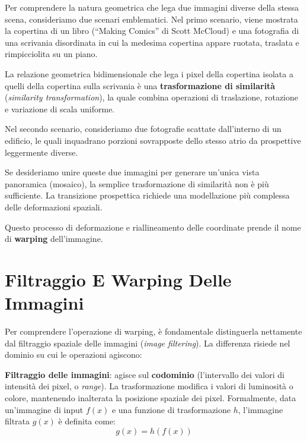 ﻿\documentclass[11pt, a4paper]{article}
\begin{document}
Per comprendere la natura geometrica che lega due immagini diverse della stessa scena, consideriamo due scenari emblematici. Nel primo scenario, viene mostrata la copertina di un libro (``Making Comics'' di Scott McCloud) e una fotografia di una scrivania disordinata in cui la medesima copertina appare ruotata, traslata e rimpicciolita su un piano.


La relazione geometrica bidimensionale che lega i pixel della copertina isolata a quelli della copertina sulla scrivania è una \textbf{trasformazione di similarità} (\emph{similarity transformation}), la quale combina operazioni di traslazione, rotazione e variazione di scala uniforme.

Nel secondo scenario, consideriamo due fotografie scattate dall'interno di un edificio, le quali inquadrano porzioni sovrapposte dello stesso atrio da prospettive leggermente diverse.


Se desideriamo unire queste due immagini per generare un'unica vista panoramica (mosaico), la semplice trasformazione di similarità non è più sufficiente. La transizione prospettica richiede una modellazione più complessa delle deformazioni spaziali.


Questo processo di deformazione e riallineamento delle coordinate prende il nome di \textbf{warping} dell'immagine.

\newpage

\section{Filtraggio E Warping Delle Immagini}

Per comprendere l'operazione di warping, è fondamentale distinguerla nettamente dal filtraggio spaziale delle immagini (\emph{image filtering}). La differenza risiede nel dominio su cui le operazioni agiscono:

\textbf{Filtraggio delle immagini}: agisce sul \textbf{codominio} (l'intervallo dei valori di intensità dei pixel, o \emph{range}). La trasformazione modifica i valori di luminosità o colore, mantenendo inalterata la posizione spaziale dei pixel. Formalmente, data un'immagine di input $f(x)$ e una funzione di trasformazione $h$, l'immagine filtrata $g(x)$ è definita come:
\[
g(x) = h(f(x))
\]
\end{document}

